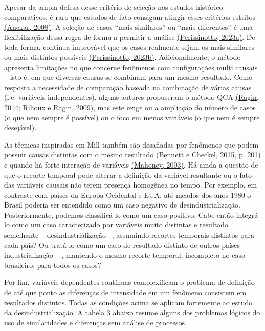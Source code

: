 Apesar da ampla defesa desse critério de seleção nos estudos
histórico-comparativos, é raro que estudos de fato consigam atingir
esses critérios estritos
\href{https://www.zotero.org/google-docs/?SURKto}{(Anckar, 2008)}. A
seleção de casos ``mais similares'' ou ``mais diferentes'' é uma
flexibilização dessa regra de forma a permitir a análise
\href{https://www.zotero.org/google-docs/?dQ4y3A}{(Perissinotto,
2023a)}. De toda forma, continua improvável que os casos realmente sejam
os mais similares ou mais distintos possíveis
\href{https://www.zotero.org/google-docs/?hyvoci}{(Perissinotto,
2023b)}. Adicionalmente, o método apresenta limitações no que concerne
fenômenos com configurações multi causais -- isto é, em que diversas
causas se combinam para um mesmo resultado. Como resposta a necessidade
de comparação baseada na combinação de várias causas (i.e. variáveis
independentes), alguns autores propuseram o método QCA
\href{https://www.zotero.org/google-docs/?dVCOC6}{(Ragin, 2014; Rihoux e
Ragin, 2009)}, mas este exige ou a ampliação do número de casos (o que
nem sempre é possível) ou o foco em menos variáveis (o que nem é sempre
desejável).

As técnicas inspiradas em Mill também são desafiadas por fenômenos que
podem possuir causas distintas com o mesmo resultado
\href{https://www.zotero.org/google-docs/?LIMWHu}{(Bennett e Checkel,
2015, p. 201)} e quando há forte interação de variáveis
\href{https://www.zotero.org/google-docs/?3mNu15}{(Mahoney, 2003)}. Há
ainda a questão de que o recorte temporal pode alterar a definição da
variável resultante ou o fato das variáveis causais não terem presença
homogênea no tempo. Por exemplo, em contraste com países da Europa
Ocidental e EUA, até meados dos anos 1980 o Brasil poderia ser entendido
como um caso negativo de desindustrialização. Posteriormente, podemos
classificá-lo como um caso positivo. Cabe então integrá-lo como um caso
caracterizado por variáveis muito distintas e resultado semelhante --
desindustrialização --, assumindo recortes temporais distintos para cada
país? Ou tratá-lo como um caso de resultado distinto de outros países --
industrialização -- , mantendo o mesmo recorte temporal, incompleto no
caso brasileiro, para todos os casos?

Por fim, variáveis dependentes contínuas complexificam o problema de
definição de até que ponto as diferenças de intensidade em um fenômeno
consistem em resultados distintos. Todas as condições acima se aplicam
fortemente ao estudo da desindustrialização. A tabela 3 abaixo resume
alguns dos problemas lógicos do uso de similaridades e diferenças sem
análise de processos.

